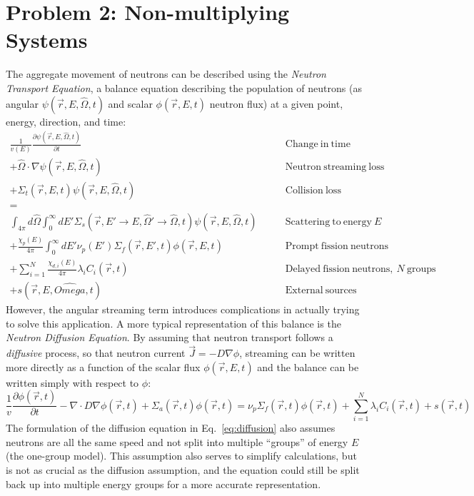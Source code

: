 \documentclass[12pt]{article}
\begin{document}
\section{Problem 2: Non-multiplying Systems}
\FloatBarrier
\newcommand{\angFlux}{\psi(\vec{r}, E, \hat{\Omega}, t)}
\newcommand{\sclFlux}{\phi(\vec{r}, E, t)}
The aggregate movement of neutrons can be described using the \emph{Neutron Transport Equation}, a balance equation describing the population of neutrons (as angular $\angFlux$ and scalar $\sclFlux$ neutron flux) at a given point, energy, direction, and time:
\begin{align}
    \frac{1}{v(E)}\frac{\partial\angFlux}{\partial t} &\qquad \mathrm{Change~in~time}\label{eq:trans_dt}\\ 
    +\hat{\Omega}\cdot\nabla\angFlux &\qquad \mathrm{Neutron~streaming~loss}\label{eq:trans_stream}\\
    + \Sigma_t(\vec{r}, E, t)\angFlux &\qquad \mathrm{Collision~loss}\label{eq:trans_coll}\\
    =&\nonumber\\
    \int_{4\pi}d\hat{\Omega}\int_0^\infty dE'\Sigma_s(\vec{r}, E'\rightarrow E, \hat{\Omega}'\rightarrow\hat{\Omega},t)\angFlux &\qquad \mathrm{Scattering~to~energy}~E\label{eq:trans_scat}\\
    +\frac{\chi_p(E)}{4\pi}\int_0^\infty dE'\nu_p(E')\Sigma_f(\vec{r},E',t)\sclFlux&\qquad \mathrm{Prompt~fission~neutrons}\label{trans_prompt}\\
    +\sum_{i=1}^{N}\frac{\chi_{d,i}(E)}{4\pi}\lambda_iC_i(\vec{r},t)&\qquad \mathrm{Delayed~fission~neutrons,~}N~\mathrm{groups}\label{eq:trans_delay}\\
    +s(\vec{r},E,\hat{Omega},t)&\qquad\mathrm{External~sources}\label{eq:trans_ext}
\end{align}
However, the angular streaming term introduces complications in actually trying to solve this application.
A more typical representation of this balance is the \emph{Neutron Diffusion Equation}.
By assuming that neutron transport follows a \emph{diffusive} process, so that neutron current $\vec{J}=-D\nabla\phi$, streaming can be written more directly as a function of the scalar flux $\sclFlux$ and the balance can be written simply with respect to $\phi$:
\newcommand{\rt}{(\vec{r}, t)}
\begin{equation}
    \label{eq:diffusion}
    \frac{1}{v}\frac{\partial \phi\rt}{\partial t}-\nabla\cdot D\nabla\phi\rt + \Sigma_a\rt\phi\rt = \nu_p\Sigma_f\rt\phi\rt + \sum_{i=1}^{N}\lambda_iC_i\rt + s\rt
\end{equation}
The formulation of the diffusion equation in Eq.~\ref{eq:diffusion} also assumes neutrons are all the same speed and not split into multiple ``groups'' of energy $E$ (the one-group model).
This assumption also serves to simplify calculations, but is not as crucial as the diffusion assumption, and the equation could still be split back up into multiple energy groups for a more accurate representation.\\
\end{document}
